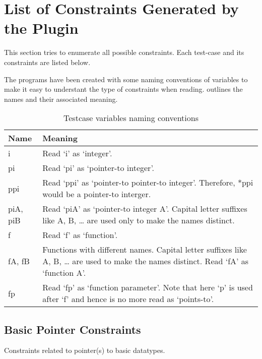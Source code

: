 \section{List of Constraints Generated by the Plugin}\label{sec:constraints}
This section tries to enumerate all possible constraints. Each test-case and its constraints are listed below.

The programs have been created with some naming conventions of variables to make it easy to understant the type of constraints when reading.  outlines the names and their associated meaning.

\begin{table}
\begin{center}
    \begin{tabular}{| m{10ex} | m{70ex} |}
    \hline
    \textbf{Name} & \textbf{Meaning} \\
    \hline
    \hline
    i & Read `i' as `integer'. \\
    \hline
    pi & Read `pi' as `pointer-to integer'.\\
    \hline
    ppi & Read `ppi' as `pointer-to pointer-to integer'. Therefore, *ppi would be a pointer-to interger. \\
    \hline
    piA, piB & Read `piA' as  `pointer-to integer A'. Capital letter suffixes like A, B, \ldots{} are used only to make the names distinct. \\
    \hline
    f & Read `f' as `function'.\\
    \hline
    fA, fB & Functions with different names. Capital letter suffixes like A, B, \ldots{} are used to make the names distinct. Read `fA' as `function A'.\\
    \hline
    fp & Read `fp' as `function parameter'. Note that here `p' is used after `f' and hence is no more read as `points-to'.\\
    \hline
    \end{tabular}
    \caption{Testcase variables naming conventions}
    \label{table:varname}
\end{center}
\end{table}

\subsection{Basic Pointer Constraints}
Constraints related to pointer(s) to basic datatypes.
